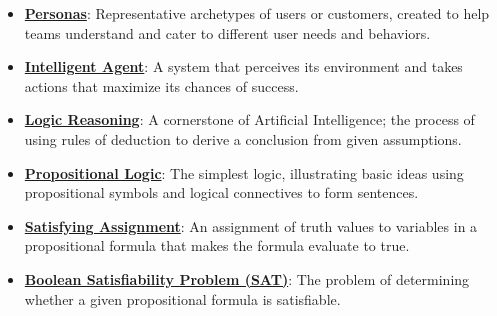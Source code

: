 \documentclass{article}%
\begin{document}
\begin{itemize}[leftmargin=*]
\item \href{https://purdue.brightspace.com/d2l/common/assets/pdfjs-d2l-dist/1.0.14-legacy/web/viewer.html?file=%2Fcontent%2Fenforced%2F1095467-wl.202510.CS.24300.001%2F12L2-distance-clusters.pdf%3Fou%3D1095467&lang=en-us&container=d2l-fileviewer-rendered-pdf&fullscreen=d2l-fileviewer-rendered-pdf-dialog&height=667#page=11}{\textbf{Personas}}: Representative archetypes of users or customers, created to help teams understand and cater to different user needs and behaviors.%
\item \href{https://purdue.brightspace.com/d2l/common/assets/pdfjs-d2l-dist/1.0.14-legacy/web/viewer.html?file=%2Fcontent%2Fenforced%2F1095467-wl.202510.CS.24300.001%2F13L1-Logic.pdf%3Fou%3D1095467&lang=en-us&container=d2l-fileviewer-rendered-pdf&fullscreen=d2l-fileviewer-rendered-pdf-dialog&height=667#page=3}{\textbf{Intelligent Agent}}: A system that perceives its environment and takes actions that maximize its chances of success.%
\item \href{https://purdue.brightspace.com/d2l/common/assets/pdfjs-d2l-dist/1.0.14-legacy/web/viewer.html?file=%2Fcontent%2Fenforced%2F1095467-wl.202510.CS.24300.001%2F13L1-Logic.pdf%3Fou%3D1095467&lang=en-us&container=d2l-fileviewer-rendered-pdf&fullscreen=d2l-fileviewer-rendered-pdf-dialog&height=667#page=4}{\textbf{Logic Reasoning}}: A cornerstone of Artificial Intelligence; the process of using rules of deduction to derive a conclusion from given assumptions.%
\item \href{https://purdue.brightspace.com/d2l/common/assets/pdfjs-d2l-dist/1.0.14-legacy/web/viewer.html?file=%2Fcontent%2Fenforced%2F1095467-wl.202510.CS.24300.001%2F13L1-Logic.pdf%3Fou%3D1095467&lang=en-us&container=d2l-fileviewer-rendered-pdf&fullscreen=d2l-fileviewer-rendered-pdf-dialog&height=667#page=8}{\textbf{Propositional Logic}}: The simplest logic, illustrating basic ideas using propositional symbols and logical connectives to form sentences.%
\item \href{https://purdue.brightspace.com/d2l/common/assets/pdfjs-d2l-dist/1.0.14-legacy/web/viewer.html?file=%2Fcontent%2Fenforced%2F1095467-wl.202510.CS.24300.001%2F13L1-Logic.pdf%3Fou%3D1095467&lang=en-us&container=d2l-fileviewer-rendered-pdf&fullscreen=d2l-fileviewer-rendered-pdf-dialog&height=667#page=15}{\textbf{Satisfying Assignment}}: An assignment of truth values to variables in a propositional formula that makes the formula evaluate to true.%
\item \href{https://purdue.brightspace.com/d2l/common/assets/pdfjs-d2l-dist/1.0.14-legacy/web/viewer.html?file=%2Fcontent%2Fenforced%2F1095467-wl.202510.CS.24300.001%2F13L1-Logic.pdf%3Fou%3D1095467&lang=en-us&container=d2l-fileviewer-rendered-pdf&fullscreen=d2l-fileviewer-rendered-pdf-dialog&height=667#page=15}{\textbf{Boolean Satisfiability Problem (SAT)}}: The problem of determining whether a given propositional formula is satisfiable.%

\end{itemize}
\end{document}
